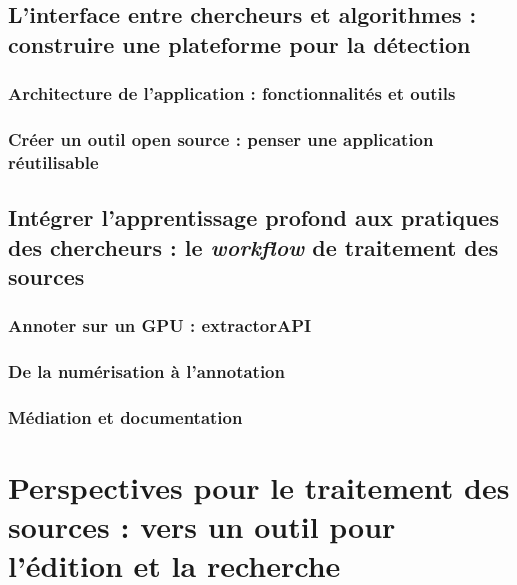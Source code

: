 \documentclass[a4paper,12pt,twoside]{book}
\newcommand{\clearemptydoublepage}{\newpage{\pagestyle{empty}\cleardoublepage}}
\begin{document}
        \chapter[L’interface entre chercheurs et algorithme]{L’interface entre chercheurs et algorithmes : construire une plateforme pour la détection}
                \section[Architecture de l’application]{Architecture de l’application : fonctionnalités et outils}
                    
                    
                \section{Créer un outil open source : penser une application réutilisable}
            		
            
        \clearemptydoublepage
        
        \chapter[\textit{Deep learning} et pratiques des chercheurs]{Intégrer l’apprentissage profond aux pratiques des chercheurs : le \textit{workflow} de traitement des sources}
                \section{Annoter sur un GPU : extractorAPI}
                    
            
                \section{De la numérisation à l’annotation}
                    
             
                \section{Médiation et documentation}
                    
            
        \clearemptydoublepage

    \part{Perspectives pour le traitement des sources : vers un outil pour l’édition et la recherche}
\end{document}

